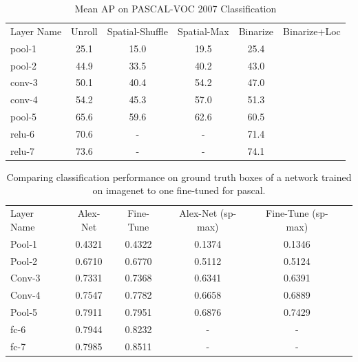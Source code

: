 \documentclass[runningheads]{llncs}
\begin{document}
\setlength{\tabcolsep}{4pt}
\begin{table}
\begin{center}
\caption{Mean AP on PASCAL-VOC 2007 Classification}
\label{table:headings}
\begin{tabular}{lccccc}
\hline\noalign{\smallskip}
Layer Name & Unroll & Spatial-Shuffle & Spatial-Max & Binarize & Binarize+Loc\\
\noalign{\smallskip}
\hline
\noalign{\smallskip}
pool-1 & 25.1 & 15.0 & 19.5 & 25.4 \\
pool-2 & 44.9 & 33.5 & 40.2 & 43.0\\
conv-3 & 50.1 & 40.4 & 54.2 & 47.0\\
conv-4 & 54.2 & 45.3 & 57.0 & 51.3\\
pool-5 & 65.6 & 59.6 & 62.6 & 60.5\\
relu-6 & 70.6 &  -   &  -   & 71.4 \\
relu-7 & 73.6 &  -   &  -   & 74.1 \\
\hline
\end{tabular}
\end{center}
\end{table}
\setlength{\tabcolsep}{1.4pt}


\setlength{\tabcolsep}{4pt}
\begin{table}
\begin{center}
\caption{Comparing classification performance on ground truth boxes of a network trained on imagenet to one fine-tuned for pascal.}
\label{table:headings}
\begin{tabular}{lccccc}
\hline\noalign{\smallskip}
Layer Name & Alex-Net & Fine-Tune & Alex-Net (sp-max) & Fine-Tune (sp-max) \\
\noalign{\smallskip}
\hline
\noalign{\smallskip}
Pool-1 & 0.4321 & 0.4322 & 0.1374 & 0.1346 \\
Pool-2 & 0.6710 & 0.6770 & 0.5112 & 0.5124\\
Conv-3 & 0.7331 & 0.7368 & 0.6341 & 0.6391\\
Conv-4 & 0.7547 & 0.7782 & 0.6658 & 0.6889\\
Pool-5 & 0.7911 & 0.7951 & 0.6876 & 0.7429 \\
fc-6   & 0.7944 & 0.8232 & - & -\\
fc-7   & 0.7985 & 0.8511 & - & -\\
\hline
\end{tabular}
\end{center}
\end{table}
\setlength{\tabcolsep}{1.4pt}
\end{document}
